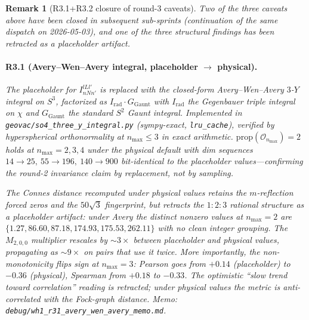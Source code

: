 \documentclass[11pt]{article}
\newtheorem{remark}{Remark}
\begin{document}
\begin{remark}[R3.1+R3.2 closure of round-3 caveats]
\label{rem:r31_r32_update}
Two of the three caveats above have been closed in subsequent
sub-sprints (continuation of the same dispatch on 2026-05-03), and
one of the three structural findings has been retracted as a
placeholder artifact.

\paragraph{R3.1 (Avery--Wen--Avery integral, placeholder $\to$
physical).}  The placeholder for $I_{n N n'}^{l L l'}$ is replaced
with the closed-form Avery--Wen--Avery $3$-$Y$ integral on $S^3$,
factorized as $I_{\mathrm{rad}} \cdot G_{\mathrm{Gaunt}}$ with
$I_{\mathrm{rad}}$ the Gegenbauer triple integral on $\chi$ and
$G_{\mathrm{Gaunt}}$ the standard $S^2$ Gaunt integral.
Implemented in \texttt{geovac/so4\_three\_y\_integral.py}
(sympy-exact, \texttt{lru\_cache}), verified by hyperspherical
orthonormality at $n_{\max} \le 3$ in exact arithmetic.
$\mathrm{prop}(\mathcal{O}_{n_{\max}}) = 2$ holds at $n_{\max} =
2, 3, 4$ under the physical default with dim sequences $14 \to
25,\ 55 \to 196,\ 140 \to 900$ \emph{bit-identical} to the
placeholder values---confirming the round-2 invariance claim by
replacement, not by sampling.

The Connes distance recomputed under physical values retains
the $m$-reflection forced zeros and the $50\sqrt{3}$ fingerprint,
but \emph{retracts} the $1 : 2 : 3$ rational structure as a
placeholder artifact: under Avery the distinct nonzero values at
$n_{\max} = 2$ are $\{1.27, 86.60, 87.18, 174.93, 175.53,
262.11\}$ with no clean integer grouping.  The $M_{2,0,0}$
multiplier rescales by $\sim 3\times$ between placeholder and
physical values, propagating as $\sim 9\times$ on pairs that use
it twice.  More importantly, the non-monotonicity \emph{flips
sign} at $n_{\max} = 3$: Pearson goes from $+0.14$ (placeholder)
to $-0.36$ (physical), Spearman from $+0.18$ to $-0.33$.  The
optimistic ``slow trend toward correlation'' reading is
retracted; under physical values the metric is
\emph{anti-correlated} with the Fock-graph distance.  Memo:
\texttt{debug/wh1\_r31\_avery\_wen\_avery\_memo.md}.


\end{remark}
\end{document}
